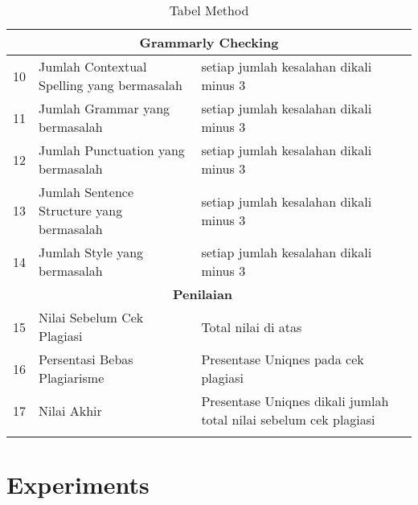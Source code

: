 \begin{longtable}{|p{}|p{}|p{}|p{}|}
\multicolumn{4}{c}{\textbf{Grammarly Checking}}\\ \hline

10 &Jumlah Contextual Spelling yang bermasalah&setiap jumlah kesalahan dikali minus 3& \\ \hline

11 &Jumlah Grammar yang bermasalah&setiap jumlah kesalahan dikali minus 3& \\ \hline

12 &Jumlah Punctuation yang bermasalah&setiap jumlah kesalahan dikali minus 3& \\ \hline

13 &Jumlah Sentence Structure yang bermasalah&setiap jumlah kesalahan dikali minus 3& \\ \hline

14 &Jumlah Style yang bermasalah&setiap jumlah kesalahan dikali minus 3& \\ \hline

\multicolumn{3}{c}{\textbf{Penilaian}}\\ \hline

15 &Nilai Sebelum Cek Plagiasi&Total nilai di atas& \\ \hline

16 &Persentasi Bebas Plagiarisme&Presentase Uniqnes pada cek plagiasi& \\ \hline

17 &Nilai Akhir&Presentase Uniqnes dikali jumlah total nilai sebelum cek plagiasi& \\ \hline

\caption{Tabel Method}
\label{table:method}
\end{longtable}

\section{Experiments}

